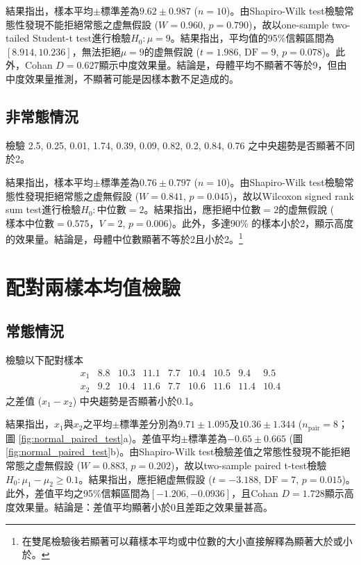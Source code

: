 \documentclass[12pt, a4paper, onecolumn]{article}
\begin{document}
結果指出，樣本平均$\pm$標準差為$9.62 \pm 0.987$ ($n = 10$)。由Shapiro-Wilk test檢驗常態性發現不能拒絕常態之虚無假設 ($W = 0.960$, $p = 0.790$)，故以one-sample two-tailed Student-t test進行檢驗$H_0: \mu=9$。結果指出，平均值的95\%信賴區間為$\left[8.914, 10.236\right]$，無法拒絕$\mu = 9$的虚無假說 ($t = 1.986$, $\text{DF} = 9$, $p = 0.078$)。此外，Cohan $D = 0.627$顯示中度效果量。結論是，母體平均不顯著不等於9，但由中度效果量推測，不顯著可能是因樣本數不足造成的。

\subsection{非常態情況}
檢驗 2.5, 0.25, 0.01, 1.74, 0.39, 0.09, 0.82, 0.2, 0.84, 0.76 之中央趨勢是否顯著不同於2。

結果指出，樣本平均$\pm$標準差為$0.76 \pm 0.797$ ($n = 10$)。由Shapiro-Wilk test檢驗常態性發現拒絕常態之虚無假設 ($W = 0.841$, $p = 0.045$)，故以Wilcoxon signed rank sum test進行檢驗$H_0: \text{中位數}=2$。結果指出，應拒絕中位數$=2$的虚無假說 ($\text{樣本中位數}=0.575$，$V = 2$, $p = 0.006$)。此外，多達90\% 的樣本小於2，顯示高度的效果量。結論是，母體中位數顯著不等於2且小於2。\footnote{在雙尾檢驗後若顯著可以藉樣本平均或中位數的大小直接解釋為顯著大於或小於。}

\section{配對兩樣本均值檢驗}
\subsection{常態情況}
檢驗以下配對樣本
\[
\begin{matrix}
x_1 & 8.8 & 10.3 & 11.1 & 7.7 &10.4 & 10.5 & 9.4 & 9.5 \\
x_2 & 9.2 & 10.4 & 11.6 & 7.7 & 10.6 & 11.6 & 11.4 & 10.4
\end{matrix}
\]
之差值 ($x_1 - x_2$) 中央趨勢是否顯著小於0.1。

結果指出，$x_1$與$x_2$之平均$\pm$標準差分別為$9.71 \pm 1.095$及$10.36 \pm 1.344$ ($n_\mathrm{pair} = 8$； 圖 \ref{fig:normal_paired_test}a)。差值平均$\pm$標準差為$-0.65\pm0.665$  (圖 \ref{fig:normal_paired_test}b)。由Shapiro-Wilk test檢驗差值之常態性發現不能拒絕常態之虚無假設 ($W = 0.883$, $p = 0.202$)，故以two-sample paired t-test檢驗$H_0: \mu_1 - \mu_2 \geq 0.1$。結果指出，應拒絕虚無假設 ($t = -3.188$, $\text{DF} = 7$, $p = 0.015$)。此外，差值平均之95\%信賴區間為$\left[-1.206, -0.0936\right]$，且Cohan $D = 1.728$顯示高度效果量。結論是：差值平均顯著小於0且差距之效果量甚高。
\end{document}
